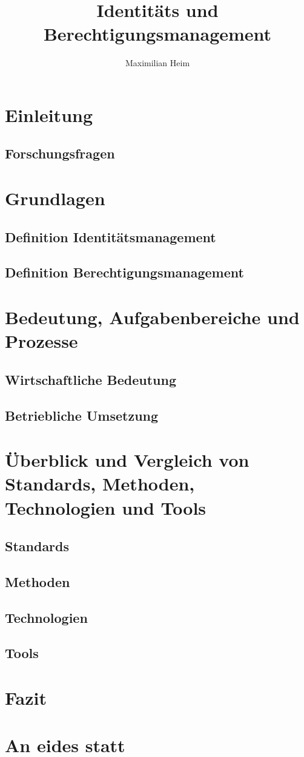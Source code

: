 \documentclass[10pt]{article}
\author{Maximilian Heim}
\title{Identitäts und Berechtigungsmanagement}
\begin{document}
\maketitle
\newpage
\tableofcontents
\newpage
\section{Einleitung}
\subsection{Forschungsfragen}
\section{Grundlagen}
\subsection{Definition Identitätsmanagement}
\subsection{Definition Berechtigungsmanagement}
\section{Bedeutung, Aufgabenbereiche und Prozesse}
\subsection{Wirtschaftliche Bedeutung}
\subsection{Betriebliche Umsetzung}
\section{Überblick und Vergleich von Standards, Methoden, Technologien und Tools}
\subsection{Standards}
\subsection{Methoden}
\subsection{Technologien}
\subsection{Tools}
\section{Fazit}
\section{An eides statt}
\end{document}
